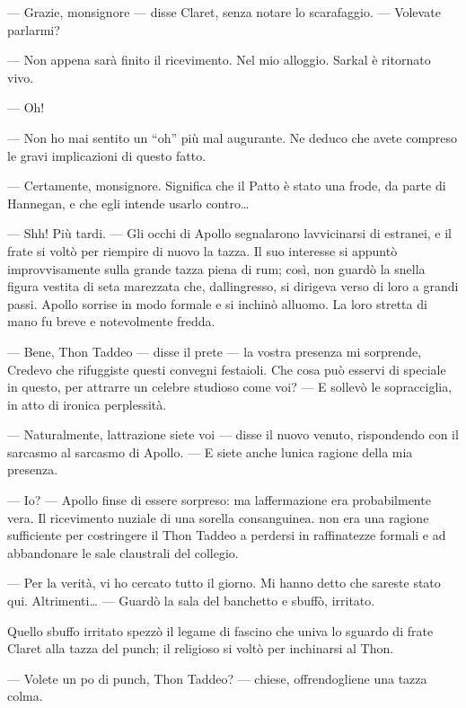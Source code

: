 	--- Grazie, monsignore --- disse Claret, senza notare lo scarafaggio.
	--- Volevate parlarmi?
	
	--- Non appena sarà finito il ricevimento. Nel mio alloggio. Sarkal è
	ritornato vivo.
	
	--- Oh!
	
	--- Non ho mai sentito un ``oh'' più mal augurante. Ne deduco che avete
	compreso le gravi implicazioni di questo fatto.
	
	--- Certamente, monsignore. Significa che il Patto è stato una frode, da
	parte di Hannegan, e che egli intende usarlo contro\ldots{}
	
	--- Shh! Più tardi. --- Gli occhi di Apollo segnalarono
	l\textquotesingle avvicinarsi di estranei, e il frate si voltò per
	riempire di nuovo la tazza. Il suo interesse si appuntò improvvisamente
	sulla grande tazza piena di rum; così, non guardò la snella figura
	vestita di seta marezzata che, dall\textquotesingle ingresso, si
	dirigeva verso di loro a grandi passi. Apollo sorrise in modo formale e
	si inchinò all\textquotesingle uomo. La loro stretta di mano fu breve e
	notevolmente fredda.
	
	--- Bene, Thon Taddeo --- disse il prete --- la vostra presenza mi
	sorprende, Credevo che rifuggiste questi convegni festaioli. Che cosa
	può esservi di speciale in questo, per attrarre un celebre studioso come
	voi? --- E sollevò le sopracciglia, in atto di ironica perplessità.
	
	--- Naturalmente, l\textquotesingle attrazione siete voi --- disse il
	nuovo venuto, rispondendo con il sarcasmo al sarcasmo di Apollo. --- E
	siete anche l\textquotesingle unica ragione della mia presenza.
	
	--- Io? --- Apollo finse di essere sorpreso: ma
	l\textquotesingle affermazione era probabilmente vera. Il ricevimento
	nuziale di una sorella consanguinea. non era una ragione sufficiente per
	costringere il Thon Taddeo a perdersi in raffinatezze formali e ad
	abbandonare le sale claustrali del collegio.
	
	--- Per la verità, vi ho cercato tutto il giorno. Mi hanno detto che
	sareste stato qui. Altrimenti\ldots{} --- Guardò la sala del banchetto e
	sbuffò, irritato.
	
	Quello sbuffo irritato spezzò il legame di fascino che univa lo sguardo
	di frate Claret alla tazza del punch; il religioso si voltò per
	inchinarsi al Thon.
	
	--- Volete un po\textquotesingle{} di punch, Thon Taddeo? --- chiese,
	offrendogliene una tazza colma.
	
